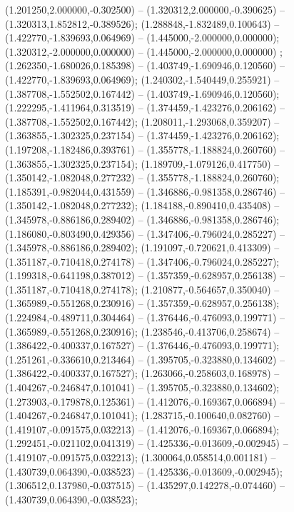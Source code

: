  (1.201250,2.000000,-0.302500) -- (1.320312,2.000000,-0.390625) -- (1.320313,1.852812,-0.389526);
 (1.288848,-1.832489,0.100643) -- (1.422770,-1.839693,0.064969) -- (1.445000,-2.000000,0.000000);
 (1.320312,-2.000000,0.000000) -- (1.445000,-2.000000,0.000000) ;
 (1.262350,-1.680026,0.185398) -- (1.403749,-1.690946,0.120560) -- (1.422770,-1.839693,0.064969);
 (1.240302,-1.540449,0.255921) -- (1.387708,-1.552502,0.167442) -- (1.403749,-1.690946,0.120560);
 (1.222295,-1.411964,0.313519) -- (1.374459,-1.423276,0.206162) -- (1.387708,-1.552502,0.167442);
 (1.208011,-1.293068,0.359207) -- (1.363855,-1.302325,0.237154) -- (1.374459,-1.423276,0.206162);
 (1.197208,-1.182486,0.393761) -- (1.355778,-1.188824,0.260760) -- (1.363855,-1.302325,0.237154);
 (1.189709,-1.079126,0.417750) -- (1.350142,-1.082048,0.277232) -- (1.355778,-1.188824,0.260760);
 (1.185391,-0.982044,0.431559) -- (1.346886,-0.981358,0.286746) -- (1.350142,-1.082048,0.277232);
 (1.184188,-0.890410,0.435408) -- (1.345978,-0.886186,0.289402) -- (1.346886,-0.981358,0.286746);
 (1.186080,-0.803490,0.429356) -- (1.347406,-0.796024,0.285227) -- (1.345978,-0.886186,0.289402);
 (1.191097,-0.720621,0.413309) -- (1.351187,-0.710418,0.274178) -- (1.347406,-0.796024,0.285227);
 (1.199318,-0.641198,0.387012) -- (1.357359,-0.628957,0.256138) -- (1.351187,-0.710418,0.274178);
 (1.210877,-0.564657,0.350040) -- (1.365989,-0.551268,0.230916) -- (1.357359,-0.628957,0.256138);
 (1.224984,-0.489711,0.304464) -- (1.376446,-0.476093,0.199771) -- (1.365989,-0.551268,0.230916);
 (1.238546,-0.413706,0.258674) -- (1.386422,-0.400337,0.167527) -- (1.376446,-0.476093,0.199771);
 (1.251261,-0.336610,0.213464) -- (1.395705,-0.323880,0.134602) -- (1.386422,-0.400337,0.167527);
 (1.263066,-0.258603,0.168978) -- (1.404267,-0.246847,0.101041) -- (1.395705,-0.323880,0.134602);
 (1.273903,-0.179878,0.125361) -- (1.412076,-0.169367,0.066894) -- (1.404267,-0.246847,0.101041);
 (1.283715,-0.100640,0.082760) -- (1.419107,-0.091575,0.032213) -- (1.412076,-0.169367,0.066894);
 (1.292451,-0.021102,0.041319) -- (1.425336,-0.013609,-0.002945) -- (1.419107,-0.091575,0.032213);
 (1.300064,0.058514,0.001181) -- (1.430739,0.064390,-0.038523) -- (1.425336,-0.013609,-0.002945);
 (1.306512,0.137980,-0.037515) -- (1.435297,0.142278,-0.074460) -- (1.430739,0.064390,-0.038523);

